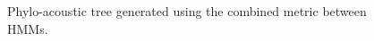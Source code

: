\documentclass[pdftex,11pt,a4paper]{article}
\theoremstyle{definition}
\theoremstyle{remark}
\begin{document}
\begin{figure}
\noindent{}
    \caption{Phylo-acoustic tree generated using the combined metric between HMMs.}
    \label{fig:hmmskld}
\end{figure}
\end{document}
